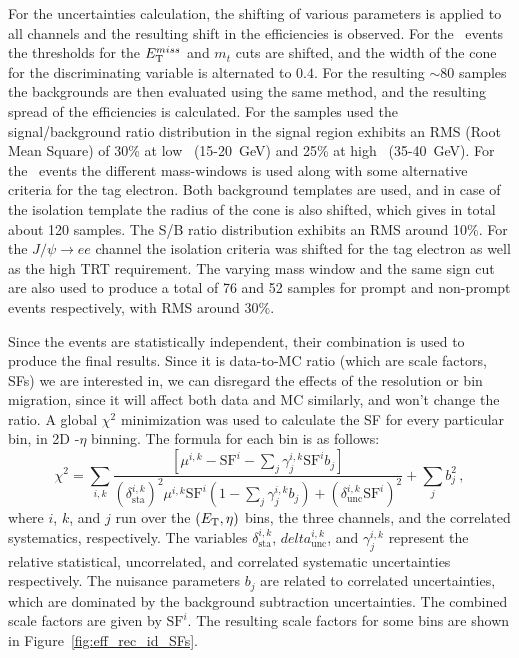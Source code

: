For the uncertainties calculation, the shifting of various parameters is applied to all channels and the resulting shift in the efficiencies is observed. For the \Wenu\ events the thresholds for the $E_{\mathrm{T}}^{miss}$ and $m_{t}$ cuts are shifted, and the width of the cone for the discriminating variable is alternated to $0.4$. For the resulting $\sim$80 samples the backgrounds are then evaluated using the same method, and the resulting spread of the efficiencies is calculated. For the samples used the signal/background ratio distribution in the signal region exhibits an RMS (Root Mean Square) of 30\% at low \et\ (15-20~GeV) and 25\% at high \et\ (35-40~GeV). For the \Zee\ events the different mass-windows is used along with some alternative criteria for the tag electron. Both background templates are used, and in case of the isolation template the radius of the cone is also shifted, which gives in total about 120 samples. The S/B ratio distribution exhibits an RMS around 10\%. For the $J/\psi \to ee$ channel the isolation criteria was shifted for the tag electron as well as the high TRT requirement. The varying mass window and the same sign cut are also used to produce a total of 76 and 52 samples for prompt and non-prompt events respectively, with RMS around 30\%.

Since the events are statistically independent, their combination is used to produce the final results. Since it is data-to-MC ratio (which are scale factors, SFs) we are interested in, we can disregard the effects of the resolution or bin migration, since it will affect both data and MC similarly, and won't change the ratio. A global $\chi^{2}$ minimization was used to calculate the SF for every particular bin, in 2D \pt-$\eta$ binning. The formula for each bin is as follows:
\begin{equation}
\chi^{2} = \sum_{i,k} \frac{\left[ \mu^{i,k} - \mathrm{SF}^{i} - \sum_{j} \gamma_{j}^{i,k}\mathrm{SF}^{i}b_{j} \right]}
  {\left( \delta^{i,k}_{\mathrm{sta}} \right)^{2} \mu^{i,k}\mathrm{SF}^{i} \left( 1 - \sum_{j} \gamma_{j}^{i,k}b_{j} \right) + \left(\delta^{i,k}_{\mathrm{unc}} \mathrm{SF}^{i} \right)^{2}}
  + \sum_{j} b_{j}^{2} \,,
\end{equation}
where $i$, $k$, and $j$ run  over  the  $(E_{\mathrm{T}}, \eta)$ bins, the three channels, and the correlated systematics, respectively. The variables $\delta^{i,k}_{\mathrm{sta}}$, $delta^{i,k}_{\mathrm{unc}}$, and $\gamma_{j}^{i,k}$ represent the relative statistical, uncorrelated, and correlated systematic uncertainties respectively. The nuisance parameters $b_{j}$ are  related  to  correlated  uncertainties,  which are  dominated  by  the  background subtraction uncertainties. The combined scale factors are given by $\mathrm{SF}^{i}$. The resulting scale factors for some bins are shown in Figure~\ref{fig:eff_rec_id_SFs}.


